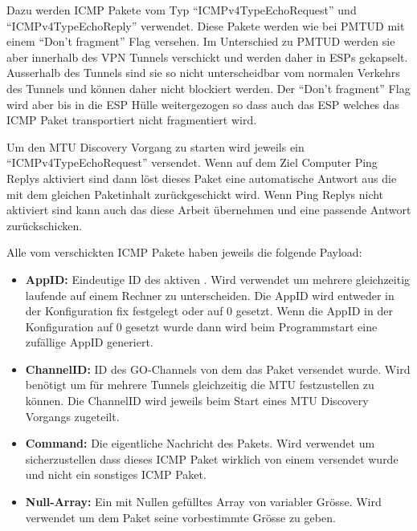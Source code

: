 Dazu werden \acs{ICMP} Pakete vom Typ \enquote{ICMPv4TypeEchoRequest} und \enquote{ICMPv4TypeEchoReply} verwendet. Diese Pakete werden wie bei \acs{PMTUD} mit einem \enquote{Don't fragment} Flag versehen. Im Unterschied zu \acs{PMTUD} werden sie aber innerhalb des \acs{VPN} Tunnels verschickt und werden daher in \acs{ESP}s gekapselt. Ausserhalb des Tunnels sind sie so nicht unterscheidbar vom normalen Verkehrs des Tunnels und können daher nicht blockiert werden. Der \enquote{Don't fragment} Flag wird aber bis in die \acs{ESP} Hülle weitergezogen so dass auch das \acs{ESP} welches das \acs{ICMP} Paket transportiert nicht fragmentiert wird.


Um den \acs{MTU} Discovery Vorgang zu starten wird jeweils ein \enquote{ICMPv4TypeEchoRequest} versendet. Wenn auf dem Ziel Computer Ping Replys aktiviert sind dann löst dieses Paket eine automatische Antwort aus die mit dem gleichen Paketinhalt zurückgeschickt wird. Wenn Ping Replys nicht aktiviert sind kann auch das \tool diese Arbeit übernehmen und eine passende Antwort zurückschicken.

Alle vom \tool verschickten \acs{ICMP} Pakete haben jeweils die folgende Payload:

\begin{itemize}
  \item \textbf{AppID:} Eindeutige ID des aktiven \tool. Wird verwendet um mehrere gleichzeitig laufende \tool auf einem Rechner zu unterscheiden. Die AppID wird entweder in der Konfiguration fix festgelegt oder auf 0 gesetzt. Wenn die AppID in der Konfiguration auf 0 gesetzt wurde dann wird beim Programmstart eine zufällige AppID generiert.
  \item \textbf{ChannelID:} ID des GO-Channels von dem das Paket versendet wurde. Wird benötigt um für mehrere Tunnels gleichzeitig die \acs{MTU} festzustellen zu können. Die ChannelID wird jeweils beim Start eines \acs{MTU} Discovery Vorgangs zugeteilt.
  \item \textbf{Command:} Die eigentliche Nachricht des Pakets. Wird verwendet um sicherzustellen dass dieses \acs{ICMP} Paket wirklich von einem \tool versendet wurde und nicht ein sonstiges \acs{ICMP} Paket.
  \item \textbf{Null-Array:} Ein mit Nullen gefülltes Array von variabler Grösse. Wird verwendet um dem Paket seine vorbestimmte Grösse zu geben.
\end{itemize}

